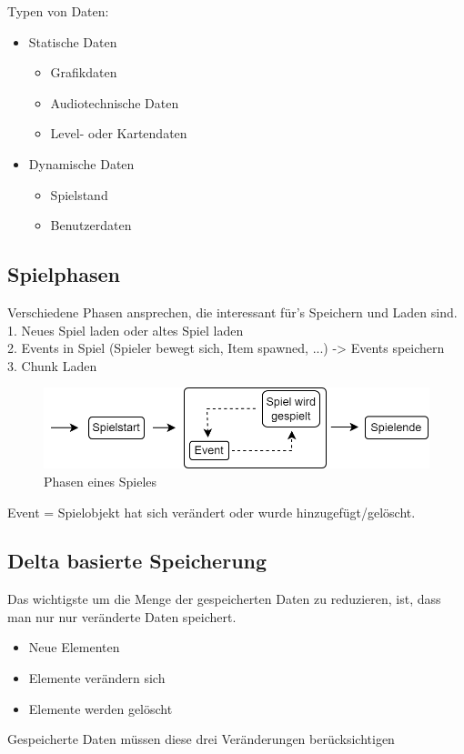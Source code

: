 Typen von Daten:\\
\begin{itemize}
    \item Statische Daten
    \begin{itemize}
        \item Grafikdaten
        \item Audiotechnische Daten
        \item Level- oder Kartendaten
    \end{itemize}
    \item Dynamische Daten
    \begin{itemize}
        \item Spielstand
        \item Benutzerdaten
    \end{itemize}
\end{itemize}


\subsection{Spielphasen}
Verschiedene Phasen ansprechen, die interessant für's Speichern und Laden sind.\\
1. Neues Spiel laden oder altes Spiel laden\\
2. Events in Spiel (Spieler bewegt sich, Item spawned, ...) -> Events speichern\\
3. Chunk Laden 

\begin{figure}[H]
    \centering
    \includegraphics[scale=0.5]{images/Spielphasen.png}
    \caption{Phasen eines Spieles}
    \label{fig:spielphasen}
\end{figure}


Event = Spielobjekt hat sich verändert oder wurde hinzugefügt/gelöscht.


\subsection{Delta basierte Speicherung}
Das wichtigste um die Menge der gespeicherten Daten zu reduzieren, ist, dass man nur nur veränderte Daten speichert. 
\begin{itemize}
    \item Neue Elementen
    \item Elemente verändern sich
    \item Elemente werden gelöscht
\end{itemize}
Gespeicherte Daten müssen diese drei Veränderungen berücksichtigen


